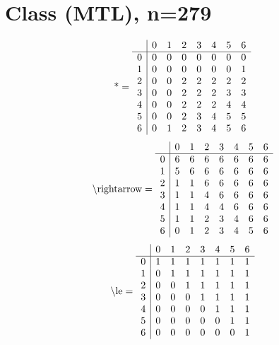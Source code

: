 \documentclass[11pt]{article}
\begin{document}
\section{Class (MTL), n=279}
\[\text{*} = 
\begin{array}{r | r r r r r r r}
 & 0 & 1 & 2 & 3 & 4 & 5 & 6 \\ \hline
0 & 0 & 0 & 0 & 0 & 0 & 0 & 0 \\
1 & 0 & 0 & 0 & 0 & 0 & 0 & 1 \\
2 & 0 & 0 & 2 & 2 & 2 & 2 & 2 \\
3 & 0 & 0 & 2 & 2 & 2 & 3 & 3 \\
4 & 0 & 0 & 2 & 2 & 2 & 4 & 4 \\
5 & 0 & 0 & 2 & 3 & 4 & 5 & 5 \\
6 & 0 & 1 & 2 & 3 & 4 & 5 & 6 \\
\end{array}
\]
\[\text{\textbackslash rightarrow} = 
\begin{array}{r | r r r r r r r}
 & 0 & 1 & 2 & 3 & 4 & 5 & 6 \\ \hline
0 & 6 & 6 & 6 & 6 & 6 & 6 & 6 \\
1 & 5 & 6 & 6 & 6 & 6 & 6 & 6 \\
2 & 1 & 1 & 6 & 6 & 6 & 6 & 6 \\
3 & 1 & 1 & 4 & 6 & 6 & 6 & 6 \\
4 & 1 & 1 & 4 & 4 & 6 & 6 & 6 \\
5 & 1 & 1 & 2 & 3 & 4 & 6 & 6 \\
6 & 0 & 1 & 2 & 3 & 4 & 5 & 6 \\
\end{array}
\]
\[\text{\textbackslash le} = 
\begin{array}{r | r r r r r r r}
 & 0 & 1 & 2 & 3 & 4 & 5 & 6 \\ \hline
0 & 1 & 1 & 1 & 1 & 1 & 1 & 1 \\
1 & 0 & 1 & 1 & 1 & 1 & 1 & 1 \\
2 & 0 & 0 & 1 & 1 & 1 & 1 & 1 \\
3 & 0 & 0 & 0 & 1 & 1 & 1 & 1 \\
4 & 0 & 0 & 0 & 0 & 1 & 1 & 1 \\
5 & 0 & 0 & 0 & 0 & 0 & 1 & 1 \\
6 & 0 & 0 & 0 & 0 & 0 & 0 & 1 \\
\end{array}
\]
\end{document}
